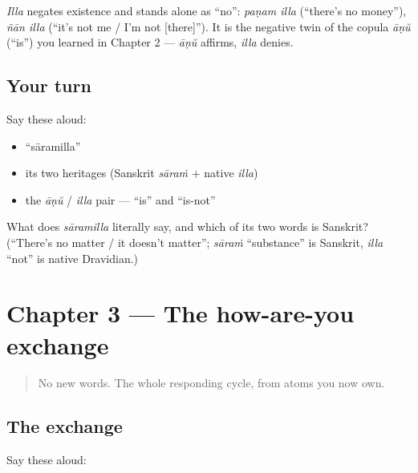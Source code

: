 \begin{grammarlens}[title={Grammar Lens: \ml{ഇല്ല}, the all-purpose \textquotedblleft{}no\textquotedblright{}}]
\emph{Illa} negates existence and stands alone as \textquotedblleft{}no\textquotedblright{}: \emph{paṇam illa} (\textquotedblleft{}there's no money\textquotedblright{}), \emph{ñān illa} (\textquotedblleft{}it's not me / I'm not {[}there{]}\textquotedblright{}). It is the negative twin of the copula \emph{āṇŭ} (\textquotedblleft{}is\textquotedblright{}) you learned in Chapter 2 — \emph{āṇŭ} affirms, \emph{illa} denies.
\end{grammarlens}

\subsection*{Your turn}
Say these aloud:

\begin{itemize}
\raggedright
  \item \textquotedblleft{}sāramilla\textquotedblright{}
  \item its two heritages (Sanskrit \emph{sāraṁ} + native \emph{illa})
  \item the \emph{āṇŭ} / \emph{illa} pair — \textquotedblleft{}is\textquotedblright{} and \textquotedblleft{}is-not\textquotedblright{}
\end{itemize}

\begin{tcolorbox}[breakable,colback=teal!4,colframe=teal!35!black,title={Before you move on}]
What does \emph{sāramilla} literally say, and which of its two words is Sanskrit? (\textquotedblleft{}There's no matter / it doesn't matter\textquotedblright{}; \emph{sāraṁ} \textquotedblleft{}substance\textquotedblright{} is Sanskrit, \emph{illa} \textquotedblleft{}not\textquotedblright{} is native Dravidian.)
\end{tcolorbox}
\section[Practice]{Chapter 3 — The how-are-you exchange}

\label{lesson:ML-C03-practice}



\begin{quote}
No new words. The whole responding cycle, from atoms you now own.
\end{quote}

\subsection*{The exchange}
Say these aloud:

